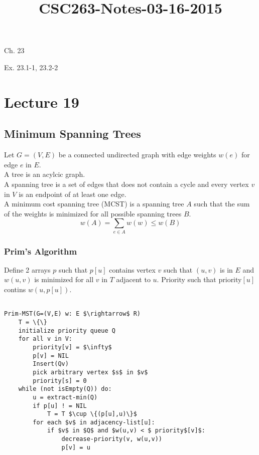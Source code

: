 



\title{CSC263-Notes-03-16-2015}



\reversemarginpar
\mpreadings

\noindent Ch. 23 \\

\mpselftest

\noindent Ex. 23.1-1, 23.2-2

\section*{Lecture 19}

\subsection*{Minimum Spanning Trees}

\noindent Let $G=(V,E)$ be a connected undirected graph with edge weights $w(e)$ for edge $e$ in $E$. \\

\noindent A tree is an acylcic graph. \\

\noindent A spanning tree is a set of edges that does not contain a cycle and every vertex $v$ in $V$ is 
an endpoint of at least one edge. \\

\noindent A minimum cost spanning tree (MCST) is a spanning tree $A$ such that the sum
of the weights is minimized for all possible spanning trees $B$.
$$ w(A) = \sum_{e \in A} w(w) \leq w(B) $$

\subsubsection*{Prim's Algorithm}

\noindent Define 2 arrays $p$ such that $p[u]$ contains vertex $v$ such that
$(u,v)$ is in $E$ and $w(u,v)$ is minimized for all $v$ in $T$ adjacent to $u$. Priority such that priority$[u]$ 
contins $w(u,p[u])$.

\begin{lstlisting}[mathescape]

Prim-MST(G=(V,E) w: E $\rightarrow$ R)
	T = \{\}
	initialize priority queue Q
	for all v in V:
		priority[v] = $\infty$
		p[v] = NIL
		Insert(Qv)
		pick arbitrary vertex $s$ in $v$
		priority[s] = 0
	while (not isEmpty(Q)) do:
		u = extract-min(Q)
		if p[u] ! = NIL
			T = T $\cup \{(p[u],u)\}$
		for each $v$ in adjacency-list[u]:
			if $v$ in $Q$ and $w(u,v) < $ priority$[v]$:
				decrease-priority(v, w(u,v))
				p[v] = u

\end{lstlisting}






















